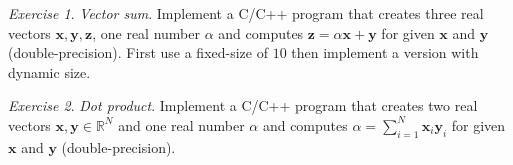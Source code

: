 \documentclass[onecolumn, oneside, a4paper, 11pt]{memoir}
\theoremstyle{remark}
\newtheorem{ex}{Exercise}
\begin{document}
\begin{ex}
\textit{Vector sum}. Implement a C/C++ program that creates three real vectors $\bm x, \bm y, \bm z$, one real number $\alpha$ and computes $\bm z = \alpha \bm x + \bm y$ for given $\bm x$ and $\bm y$ (double-precision).
First use a fixed-size of $10$ then implement a version with dynamic size.
\end{ex}

\begin{ex}
\textit{Dot product}. Implement a C/C++ program that creates two real vectors $\bm x, \bm y \in \mathbb{R}^N$ and one real number $\alpha$ and computes $\alpha = \sum_{i=1}^{N} \bm x_i \bm y_i$ for given $\bm x$ and $\bm y$ (double-precision).
\end{ex}
\end{document}
